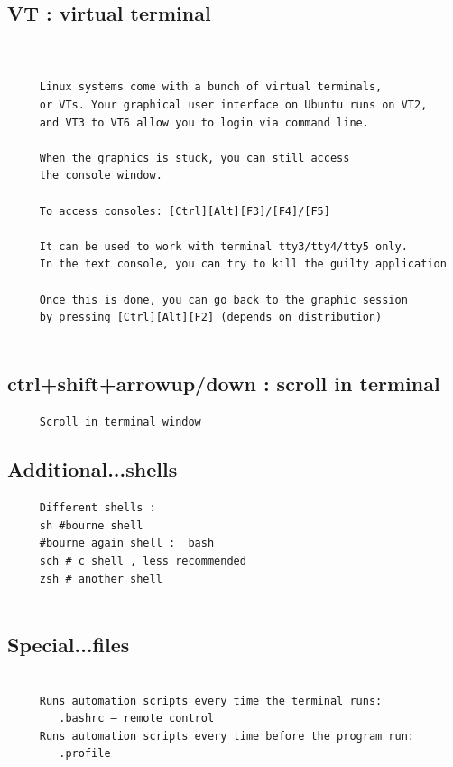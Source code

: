 \documentclass[a4paper,12pt]{article}
\begin{document}
\subsection{VT       : virtual terminal}
\begin{verbatim}
     
     
     Linux systems come with a bunch of virtual terminals,
     or VTs. Your graphical user interface on Ubuntu runs on VT2,
     and VT3 to VT6 allow you to login via command line.     
     
     When the graphics is stuck, you can still access
     the console window.

     To access consoles: [Ctrl][Alt][F3]/[F4]/[F5]
     
     It can be used to work with terminal tty3/tty4/tty5 only.
     In the text console, you can try to kill the guilty application

     Once this is done, you can go back to the graphic session
     by pressing [Ctrl][Alt][F2] (depends on distribution)     
     
\end{verbatim}



\subsection{ctrl+shift+arrowup/down     : scroll in terminal}
\begin{verbatim}
     Scroll in terminal window
\end{verbatim}


\subsection{Additional...shells }
\begin{verbatim}
     Different shells : 
     sh #bourne shell
     #bourne again shell :  bash
     sch # c shell , less recommended
     zsh # another shell 
           
\end{verbatim}

\subsection{Special...files }
\begin{verbatim}

     Runs automation scripts every time the terminal runs:
        .bashrc – remote control
     Runs automation scripts every time before the program run: 
        .profile 
           
\end{verbatim}
\end{document}

